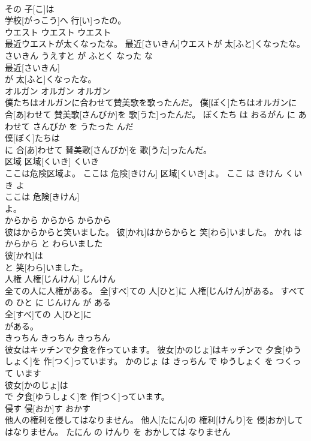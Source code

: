\documentclass[8pt]{extreport}
\begin{document}
\begin{CJK}{UTF8}{min}
\\	その 子[こ]は
\\	学校[がっこう]へ 行[い]ったの。			
\\	ウエスト	ウエスト	ウエスト	
\\	最近ウエストが太くなったな。	最近[さいきん]ウエストが 太[ふと]くなったな。	さいきん うえすと が ふとく なった な	
\\	最近[さいきん]
\\	が 太[ふと]くなったな。			
\\	オルガン	オルガン	オルガン	
\\	僕たちはオルガンに合わせて賛美歌を歌ったんだ。	僕[ぼく]たちはオルガンに 合[あ]わせて 賛美歌[さんびか]を 歌[うた]ったんだ。	ぼくたち は おるがん に あわせて さんびか を うたった んだ	
\\	僕[ぼく]たちは
\\	に 合[あ]わせて 賛美歌[さんびか]を 歌[うた]ったんだ。			
\\	区域	区域[くいき]	くいき	
\\	ここは危険区域よ。	ここは 危険[きけん] 区域[くいき]よ。	ここ は きけん くいき よ	
\\	ここは 危険[きけん]
\\	よ。			
\\	からから	からから	からから	
\\	彼はからからと笑いました。	彼[かれ]はからからと 笑[わら]いました。	かれ は からから と わらいました	
\\	彼[かれ]は
\\	と 笑[わら]いました。			
\\	人権	人権[じんけん]	じんけん	
\\	全ての人に人権がある。	全[すべ]ての 人[ひと]に 人権[じんけん]がある。	すべて の ひと に じんけん が ある	
\\	全[すべ]ての 人[ひと]に
\\	がある。			
\\	きっちん	きっちん	きっちん	
\\	彼女はキッチンで夕食を作っています。	彼女[かのじょ]はキッチンで 夕食[ゆうしょく]を 作[つく]っています。	かのじょ は きっちん で ゆうしょく を つくって います	
\\	彼女[かのじょ]は
\\	で 夕食[ゆうしょく]を 作[つく]っています。			
\\	侵す	侵[おか]す	おかす	
\\	他人の権利を侵してはなりません。	他人[たにん]の 権利[けんり]を 侵[おか]してはなりません。	たにん の けんり を おかしては なりません	

\end{CJK}
\end{document}
